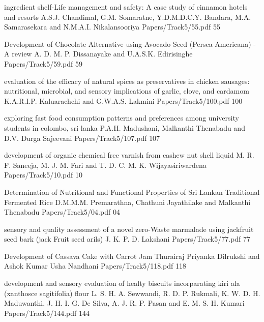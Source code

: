           \addpaper
    	{ingredient shelf-Life management and safety: A case study of cinnamon hotels and resorts}
   		 {A.S.J. Chandimal, G.M. Somaratne, Y.D.M.D.C.Y. Bandara,
M.A. Samarasekara and N.M.A.I. Nikalansooriya} 
   		 {Papers/Track5/55.pdf}
        {55}




          \addpaper
    	{Development of Chocolate Alternative using Avocado Seed (Persea Americana) - A review}
   		 {A. D. M. P. Dissanayake and U.A.S.K. Edirisinghe} 
   		 {Papers/Track5/59.pdf}
        {59}



        
        \addpaper
{evaluation of the efficacy of natural spices as preservatives in chicken sausages: nutritional, microbial, and sensory implications of garlic, clove, and cardamom}
{K.A.R.I.P. Kaluarachchi and G.W.A.S. Lakmini}
{Papers/Track5/100.pdf}
{100}

        

        \addpaper
    	{exploring fast food consumption patterns and preferences among university students in colombo, sri lanka}
   		 {P.A.H. Madushani, Malkanthi Thenabadu and D.V. Durga Sajeevani} 
   		 {Papers/Track5/107.pdf}
        {107}



            \addpaper
    	{development of organic chemical free varnish from cashew nut shell liquid}
   		 {M. R. F. Saneeja, M. J. M. Fari and T. D. C. M. K. Wijayasiriwardena} 
   		 {Papers/Track5/10.pdf}
        {10}
        
        

        \addpaper
    	{Determination of Nutritional and Functional Properties of Sri Lankan Traditional Fermented Rice}
   		 {D.M.M.M. Premarathna, Chathuni Jayathilake and Malkanthi
         Thenabadu} 
   		 {Papers/Track5/04.pdf}
        {04}

      

        
        \addpaper
    	{sensory and quality assessment of a novel zero-Waste marmalade using jackfruit seed bark (jack Fruit seed arils)}
   		 {J. K. P. D. Lakshani} 
   		 {Papers/Track5/77.pdf}
        {77}


          \addpaper
    	{Development of Cassava Cake with Carrot Jam}
   		 {Thurairaj Priyanka Dilrukshi and Ashok Kumar Usha Nandhani} 
   		 {Papers/Track5/118.pdf}
        {118}

        
        \addpaper
    	{development and sensory evaluation of healty
biscuits incorparating kiri ala (xanthosce sagitifolia)
flour}
   		 {L. S. H. A. Sewwandi, R. D. P. Rukmali, K. W. D. H. Maduwanthi, J. H. I. G.
De Silva, A. J. R. P. Pasan and E. M. S. H. Kumari} 
   		 {Papers/Track5/144.pdf}
        {144}









     

     


      

      




       


      


    


